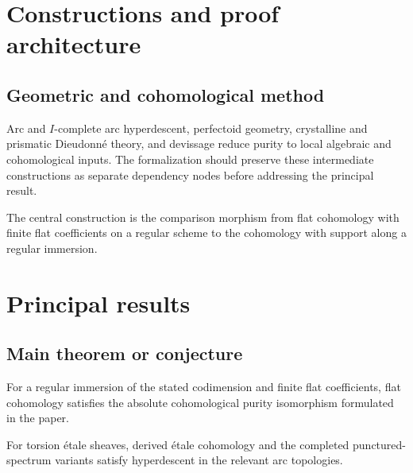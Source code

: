 \chapter{Constructions and proof architecture}
\label{chap:purity-flat-cohomology-method}

\section{Geometric and cohomological method}
\label{sec:purity-flat-cohomology-method}

Arc and $I$-complete arc hyperdescent, perfectoid geometry, crystalline and prismatic Dieudonné theory, and devissage reduce purity to local algebraic and cohomological inputs. The formalization should preserve these intermediate constructions
as separate dependency nodes before addressing the principal result.

\begin{definition}
\label{purity-flat-cohomology-central-object}
The central construction is the comparison morphism from flat cohomology with finite flat coefficients on a regular scheme to the cohomology with support along a regular immersion.
\notready
\end{definition}

\chapter{Principal results}
\label{chap:purity-flat-cohomology-results}

\section{Main theorem or conjecture}
\label{sec:purity-flat-cohomology-results}

\begin{theorem}
\label{purity-flat-cohomology-main}
For a regular immersion of the stated codimension and finite flat coefficients, flat cohomology satisfies the absolute cohomological purity isomorphism formulated in the paper.
\notready
\end{theorem}

\begin{theorem}
\label{purity-flat-cohomology-secondary}
For torsion étale sheaves, derived étale cohomology and the completed punctured-spectrum variants satisfy hyperdescent in the relevant arc topologies.
\notready
\end{theorem}
